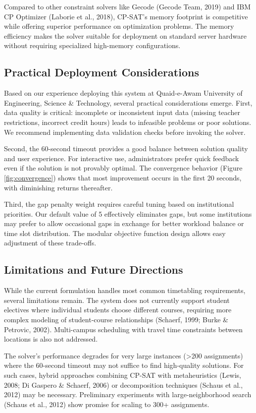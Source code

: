 \documentclass[12pt,a4paper]{article}
\begin{document}
Compared to other constraint solvers like Gecode (Gecode Team, 2019) and IBM CP Optimizer (Laborie et al., 2018), CP-SAT's memory footprint is competitive while offering superior performance on optimization problems. The memory efficiency makes the solver suitable for deployment on standard server hardware without requiring specialized high-memory configurations.

\subsection{Practical Deployment Considerations}

Based on our experience deploying this system at Quaid-e-Awam University of Engineering, Science \& Technology, several practical considerations emerge. First, data quality is critical: incomplete or inconsistent input data (missing teacher restrictions, incorrect credit hours) leads to infeasible problems or poor solutions. We recommend implementing data validation checks before invoking the solver.

Second, the 60-second timeout provides a good balance between solution quality and user experience. For interactive use, administrators prefer quick feedback even if the solution is not provably optimal. The convergence behavior (Figure \ref{fig:convergence}) shows that most improvement occurs in the first 20 seconds, with diminishing returns thereafter.

Third, the gap penalty weight requires careful tuning based on institutional priorities. Our default value of 5 effectively eliminates gaps, but some institutions may prefer to allow occasional gaps in exchange for better workload balance or time slot distribution. The modular objective function design allows easy adjustment of these trade-offs.

\subsection{Limitations and Future Directions}

While the current formulation handles most common timetabling requirements, several limitations remain. The system does not currently support student electives where individual students choose different courses, requiring more complex modeling of student-course relationships (Schaerf, 1999; Burke \& Petrovic, 2002). Multi-campus scheduling with travel time constraints between locations is also not addressed.

The solver's performance degrades for very large instances (>200 assignments) where the 60-second timeout may not suffice to find high-quality solutions. For such cases, hybrid approaches combining CP-SAT with metaheuristics (Lewis, 2008; Di Gaspero \& Schaerf, 2006) or decomposition techniques (Schaus et al., 2012) may be necessary. Preliminary experiments with large-neighborhood search (Schaus et al., 2012) show promise for scaling to 300+ assignments.
\end{document}
